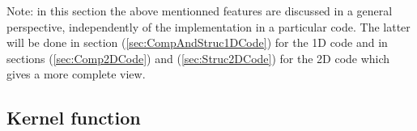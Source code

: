 \documentclass{report}
\begin{document}
Note: in this section the above mentionned features are discussed in a general perspective, independently of the implementation in a particular code. The latter will be done in section (\ref{sec:CompAndStruc1DCode}) for the 1D code and in sections (\ref{sec:Comp2DCode}) and (\ref{sec:Struc2DCode}) for the 2D code which gives a more complete view.




\subsection{Kernel function}
\label{sec:KernelFunction}
\end{document}
